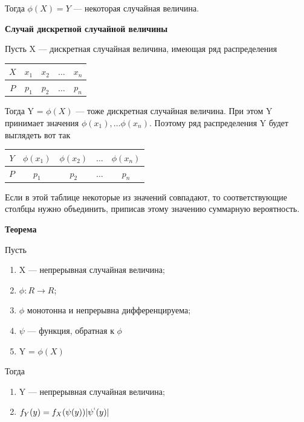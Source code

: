 Тогда $\phi(X) = Y$ --- некоторая случайная величина.

\textbf{Случай дискретной случайной величины}

Пусть X --- дискретная случайная величина, имеющая ряд распределения

\begin{table}[ht!]
	\begin{center}
		\begin{tabular}{|c|c|c|c|c|}
			\hline
			$X$ & $x_1$ & $x_2$ & $\dots$ & $x_n$ \\ 
			\hline
			$P$ & $p_1$ & $p_2$ & $\dots$ & $p_n$ \\
			\hline
		\end{tabular}
	\end{center}
\end{table}

Тогда Y = $\phi(X)$ --- тоже дискретная случайная величина. При этом Y принимает значения $\phi(x_1), \dots \phi(x_n)$. Поэтому ряд распределения Y будет выглядеть вот так

\begin{table}[ht!]
	\begin{center}
		\begin{tabular}{|c|c|c|c|c|}
			\hline
			$Y$ & $\phi(x_1)$ & $\phi(x_2)$ & $\dots$ & $\phi(x_n)$ \\ 
			\hline
			$P$ & $p_1$ & $p_2$ & $\dots$ & $p_n$ \\
			\hline
		\end{tabular}
	\end{center}
\end{table}

Если в этой таблице некоторые из значений совпадают, то соответствующие столбцы нужно объединить, приписав этому значению суммарную вероятность.

\textbf{Теорема}

Пусть

\begin{enumerate}
	\item X --- непрерывная случайная величина;
	\item $\phi : R \rightarrow R$;
	\item $\phi$ монотонна и непрерывна дифференцируема;
	\item $\psi$ --- функция, обратная к $\phi$
	\item Y = $\phi(X)$ 
\end{enumerate}

Тогда

\begin{enumerate}
	\item Y --- непрерывная случайная величина;
	\item $f_Y(y) = f_X(\psi(y))|\psi^`(y)|$
\end{enumerate}


